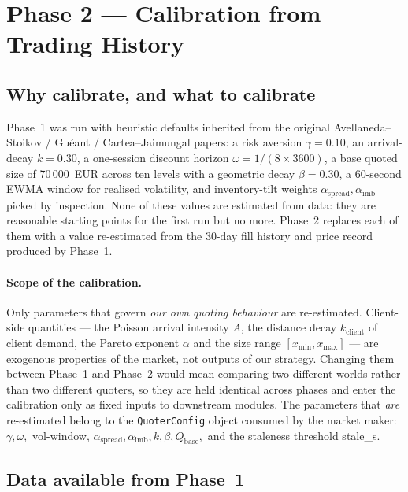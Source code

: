 \section{Phase 2 --- Calibration from Trading History}
\label{sec:phase2}

\subsection{Why calibrate, and what to calibrate}

Phase~1 was run with heuristic defaults inherited from the original
Avellaneda--Stoikov / Gu\'eant / Cartea--Jaimungal papers: a risk
aversion $\gamma = 0.10$, an arrival-decay $k = 0.30$, a one-session
discount horizon $\omega = 1/(8\!\times\!3600)$, a base quoted size of
70\,000~EUR across ten levels with a geometric decay $\beta = 0.30$,
a 60-second EWMA window for realised volatility, and inventory-tilt
weights $\alpha_{\text{spread}}, \alpha_{\text{imb}}$ picked by
inspection. None of these values are estimated from data: they are
reasonable starting points for the first run but no more. Phase~2
replaces each of them with a value re-estimated from the 30-day
fill history and price record produced by Phase~1.

\paragraph{Scope of the calibration.} Only parameters that govern
\emph{our own quoting behaviour} are re-estimated. Client-side
quantities --- the Poisson arrival intensity $A$, the distance decay
$k_{\text{client}}$ of client demand, the Pareto exponent $\alpha$
and the size range $[x_{\min}, x_{\max}]$ --- are exogenous
properties of the market, not outputs of our strategy. Changing them
between Phase~1 and Phase~2 would mean comparing two different worlds
rather than two different quoters, so they are held identical across
phases and enter the calibration only as fixed inputs to downstream
modules. The parameters that \emph{are} re-estimated belong to the
\texttt{QuoterConfig} object consumed by the market maker:
$\gamma, \omega,$ vol-window, $\alpha_{\text{spread}},
\alpha_{\text{imb}}, k, \beta, Q_{\text{base}},$ and the
staleness threshold stale\_s.

\subsection{Data available from Phase~1}

